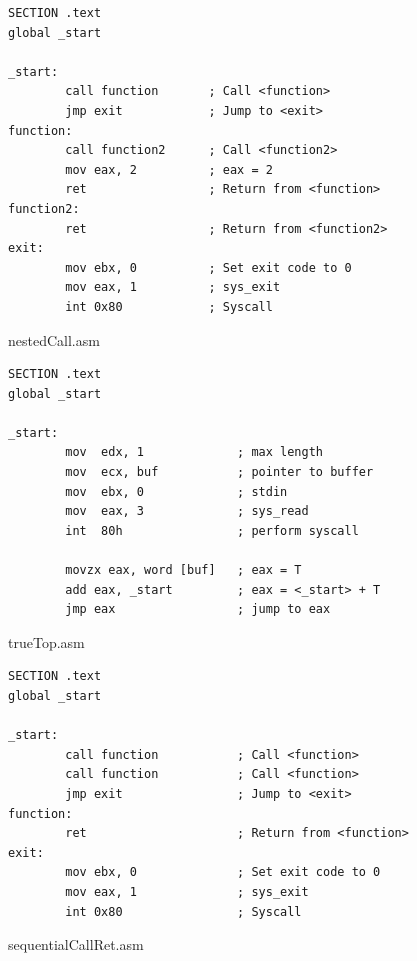 \documentclass{kththesis}
\begin{document}
\begin{figure}[t]
    \centering
\begin{tcolorbox}
\begin{verbatim}
SECTION .text
global _start

_start:
        call function       ; Call <function>
        jmp exit            ; Jump to <exit>
function:
        call function2      ; Call <function2>
        mov eax, 2          ; eax = 2
        ret                 ; Return from <function>
function2:
        ret                 ; Return from <function2>
exit:
        mov ebx, 0          ; Set exit code to 0
        mov eax, 1          ; sys_exit
        int 0x80            ; Syscall
\end{verbatim}
\end{tcolorbox}
\caption[]{nestedCall.asm}
    \label{fig:nestedCall.asm}
\end{figure}

\begin{figure}[t]
    \centering
\begin{tcolorbox}
\begin{verbatim}
SECTION .text
global _start

_start:
        mov  edx, 1             ; max length
        mov  ecx, buf           ; pointer to buffer
        mov  ebx, 0             ; stdin
        mov  eax, 3             ; sys_read
        int  80h                ; perform syscall

        movzx eax, word [buf]   ; eax = T
        add eax, _start         ; eax = <_start> + T
        jmp eax                 ; jump to eax

\end{verbatim}
\end{tcolorbox}
\caption[]{trueTop.asm}
    \label{fig:trueTop.asm}
\end{figure}

\begin{figure}[t]
    \centering
\begin{tcolorbox}
\begin{verbatim}
SECTION .text
global _start

_start:
        call function           ; Call <function>
        call function           ; Call <function>
        jmp exit                ; Jump to <exit>
function:
        ret                     ; Return from <function>
exit:
        mov ebx, 0              ; Set exit code to 0
        mov eax, 1              ; sys_exit
        int 0x80                ; Syscall
\end{verbatim}
\end{tcolorbox}
\caption[]{sequentialCallRet.asm}
    \label{fig:sequentialCallRet.asm}
\end{figure}
\end{document}
